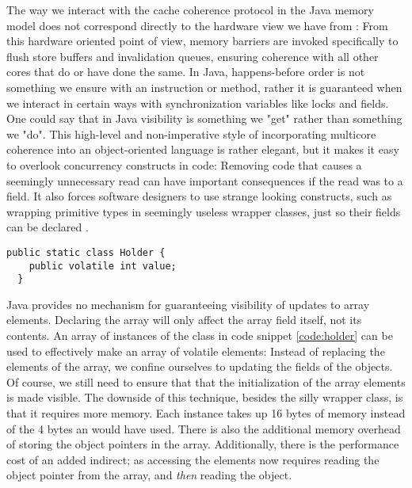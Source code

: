 The way we interact with the cache coherence protocol in the Java memory model
does not correspond directly to the hardware view we have from
\cite{mckenny-barriers}: From this hardware oriented point of view, memory
barriers are invoked specifically to flush store buffers and invalidation
queues, ensuring coherence with all other cores that do or have done the same.
In Java, happens-before order is not something we ensure with an instruction or
method, rather it is guaranteed when we interact in certain ways with
synchronization variables like locks and  fields. One could say
that in Java visibility is something we "get" rather than something we "do".
This high-level and non-imperative style of incorporating multicore coherence
into an object-oriented language is rather elegant, but it makes it easy to
overlook concurrency constructs in code: Removing code that causes a seemingly
unnecessary read can have important consequences if the read was to a
 field. It also forces software designers to use strange looking
constructs, such as wrapping primitive types in seemingly useless wrapper
classes, just so their fields can be declared .

\begin{code}
\begin{Verbatim}[frame=single]
  public static class Holder {
    public volatile int value;
  }
\end{Verbatim}
	\caption{}
	\label{code:holder}
\end{code}

Java provides no mechanism for guaranteeing visibility of updates to array
elements. Declaring the array  will only affect the array field
itself, not its contents. An array of instances of the  class in
code snippet \ref{code:holder} can be used to effectively make an array of
volatile elements: Instead of replacing the elements of the array, we confine
ourselves to updating the   fields of the
 objects. Of course, we still need to ensure that that the
initialization of the array elements is made visible. The downside of this
technique, besides the silly wrapper class, is that it requires more memory.
Each  instance takes up 16 bytes of memory instead of the 4 bytes
an  would have used. There is also the additional memory overhead of
storing the object pointers in the array. Additionally, there is the performance
cost of an added indirect; as accessing the elements now requires reading the
object pointer from the array, and \textit{then} reading the object.

